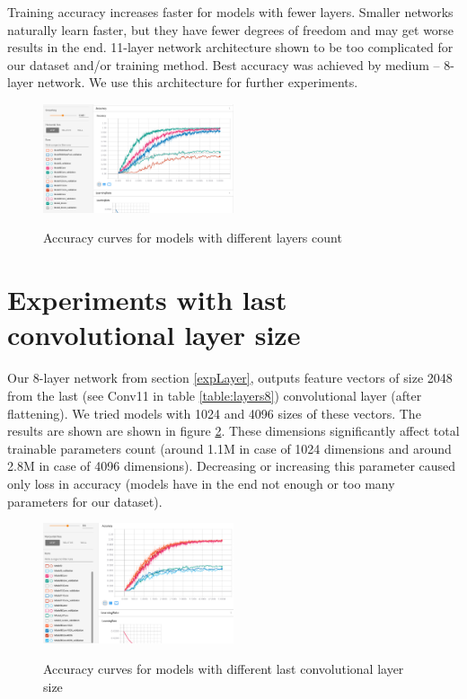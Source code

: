 \documentclass[a4paper]{article}
\begin{document}
Training accuracy increases faster for models with fewer layers.
Smaller networks naturally learn faster, but they have fewer degrees of freedom
and may get worse results in the end.
11-layer network architecture shown to be too complicated for
our dataset and/or training method.
Best accuracy was achieved by medium -- 8-layer network.
We use this architecture for further experiments.

\begin{figure}[!hbt]
    \centering
    \includegraphics[page=2,width=0.5\textwidth]{curvesLayers.png}
    \label{fig:layersAcc}
    \caption[]{Accuracy curves for models with different layers count}
\end{figure}

\section{Experiments with last convolutional layer size}

Our 8-layer network from section \ref{expLayer}, outputs
feature vectors of size 2048 from the last (see Conv11 in table \ref{table:layers8}) convolutional layer (after flattening).
We tried models with 1024 and 4096 sizes of these vectors.
The results are shown are shown in figure \ref{fig:lastSize}.
These dimensions significantly affect total trainable parameters count
(around 1.1M in case of 1024 dimensions and around 2.8M in case of 4096 dimensions).
Decreasing or increasing this parameter caused only loss in accuracy
(models have in the end not enough or too many parameters for our dataset).

\begin{figure}[!hbt]
    \centering
    \includegraphics[page=2,width=0.5\textwidth]{lastConvSize.png}
    \label{fig:lastSize}
    \caption[]{Accuracy curves for models with different last convolutional layer size}
\end{figure}
\end{document}

